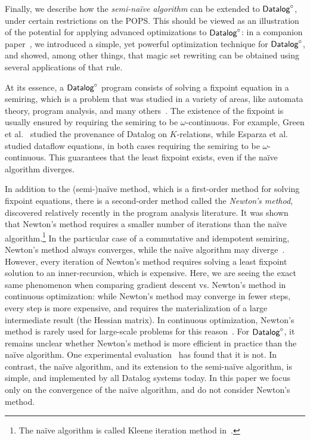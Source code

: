 Finally, we describe how the {\em semi-na\"ive algorithm} can be
extended to $\text{\sf Datalog}^\circ$, under certain restrictions on the POPS.  This
should be viewed as an illustration of the potential for applying
advanced optimizations to $\text{\sf Datalog}^\circ$: in a companion
paper~\cite{DBLP:conf/sigmod/WangK0PS22}, we introduced a simple, yet
powerful optimization technique for $\text{\sf Datalog}^\circ$, and showed, among other
things, that magic set rewriting can be obtained using several
applications of that rule.

At its essence, a $\text{\sf Datalog}^\circ$ program consists of solving a fixpoint
equation in a semiring, which is a problem that was studied in a variety
of areas, like automata theory, program analysis, and many
others~\cite{MR1470001,DBLP:conf/popl/CousotC77,MR1728440,MR1059930,
  DBLP:conf/lics/HopkinsK99, DBLP:journals/tcs/Lehmann77,
  semiring_book,MR609751}.  The existence of the fixpoint is usually
ensured by requiring the semiring to be $\omega$-continuous. For
example, Green et al.~\cite{DBLP:conf/pods/GreenKT07} studied the
provenance of Datalog on $K$-relations, while Esparza et
al.~\cite{DBLP:journals/jacm/EsparzaKL10} studied dataflow equations,
in both cases requiring the semiring to be $\omega$-continuous.  This
guarantees that the least fixpoint exists, even if the na\"ive algorithm
diverges.

In addition to the (semi-)na\"ive method, which is a first-order method for solving
fixpoint equations, there is a second-order method called the {\em Newton's method},
discovered relatively recently \cite{DBLP:journals/jacm/EsparzaKL10,DBLP:conf/lics/HopkinsK99}
in the program analysis literature.
It was shown that Newton's method requires a smaller number of iterations than the
na\"ive algorithm.\footnote{The na\"ive algorithm is called Kleene iteration
method in~\cite{DBLP:journals/jacm/EsparzaKL10}.} In the particular
case of a commutative and idempotent semiring, Newton's method always converges, while the
na\"ive algorithm may diverge~\cite{DBLP:journals/jacm/EsparzaKL10}.
However, every iteration of Newton's method requires solving a least fixpoint solution
to an inner-recursion, which is expensive.
Here, we are seeing the exact same phenomenon when comparing gradient descent vs.
Newton's method in continuous optimization: while Newton's method may converge in fewer
steps, every step is more expensive, and requires the materialization of a large intermediate
result (the Hessian matrix).
In continuous optimization, Newton's method is rarely used for large-scale problems for
this reason~\cite{DBLP:books/sp/NocedalW99}.
For $\text{\sf Datalog}^\circ$, it remains unclear whether Newton's method is more efficient in practice than
the na\"ive algorithm.  One experimental evaluation~\cite{DBLP:conf/popl/RepsTP16} has
found that it is not. In contrast, the na\"ive algorithm, and its
extension to the semi-na\"ive algorithm, is simple, and implemented by
all Datalog systems today.  In this paper we focus only on the
convergence of the na\"ive algorithm, and do not consider Newton's
method.


